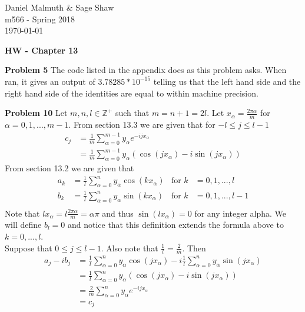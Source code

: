 \documentclass[12pt]{article}
\newcommand{\problem}[1]{\hspace{-4 ex} \large \textbf{Problem #1} }
\newcommand{\ZZ}{\mathbb{Z}}
\begin{document}
	\thispagestyle{empty}
	
	\begin{flushright}
		Daniel Malmuth \& Sage Shaw \\
		m566 - Spring 2018 \\
		\today
	\end{flushright}
	
{\large \textbf{HW - Chapter 13}}\bigbreak

\problem{5} The code listed in the appendix does as this problem asks. When ran, it gives an output of $3.78285*10^{-15}$ telling us that the left hand side and the right hand side of the identities are equal to within machine precision. 

\bigbreak
\problem{10} Let $m,n,l \in \ZZ^+$ such that $m=n+1=2l$. Let $x_\alpha = \frac{2\pi \alpha}{m}$ for $\alpha=0,1,...,m-1$. From section 13.3 we are given that for $-l \leq j \leq l-1$
\begin{align*}
	c_j & = \frac{1}{m} \sum\limits_{\alpha=0}^{m-1} y_\alpha e^{-ijx_\alpha} \\
	& = \frac{1}{m} \sum\limits_{\alpha=0}^{m-1} y_\alpha \left( \cos(jx_\alpha) - i\sin(jx_\alpha)\right)
\end{align*}
From section 13.2 we are given that
\begin{align*}
	a_k &= \frac{1}{l} \sum\limits_{\alpha=0}^{n} y_\alpha \cos(k x_\alpha) & \text{for }k&=0, 1, ..., l \\
	b_k &= \frac{1}{l} \sum\limits_{\alpha=0}^{n} y_\alpha \sin(k x_\alpha) & \text{for }k&=0, 1, ..., l-1 \\
\end{align*}
Note that $lx_\alpha = l \frac{2\pi \alpha}{m} = \alpha \pi$ and thus $\sin(l x_\alpha) = 0$ for any integer alpha. We will define $b_l=0$ and notice that this definition extends the formula above to $k=0,...,l$. \\
Suppose that $0 \leq j \leq l-1$. Also note that $\frac{1}{l} = \frac{2}{m}$. Then
\begin{align*}
	a_j - ib_j & = \frac{1}{l} \sum\limits_{\alpha=0}^{n} y_\alpha \cos(j x_\alpha) - i \frac{1}{l}\sum\limits_{\alpha=0}^{n} y_\alpha \sin(j x_\alpha) \\
	& = \frac{1}{l} \sum\limits_{\alpha=0}^{n} y_\alpha \left( \cos(j x_\alpha) - i\sin(j x_\alpha) \right) \\
	& = \frac{2}{m} \sum\limits_{\alpha=0}^{n} y_\alpha e^{-ijx_\alpha} \\
	& = c_j
\end{align*}
\end{document}
